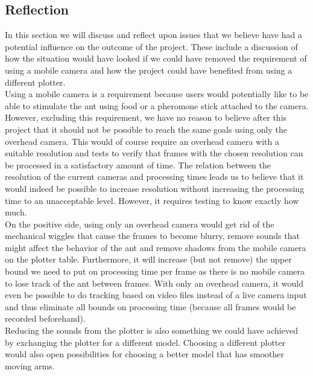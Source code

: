 
\subsection{Reflection}
In this section we will discuss and reflect upon issues that we believe have had a potential influence on the outcome of the project. These include a discussion of how the situation would have looked if we could have removed the requirement of using a mobile camera and how the project could have benefited from using a different plotter. \\

Using a mobile camera is a requirement because users would potentially like to be able to stimulate the ant using food or a pheromone stick attached to the camera. However, excluding this requirement, we have no reason to believe after this project that it should not be possible to reach the same goals using only the overhead camera. This would of course require an overhead camera with a suitable resolution and tests to verify that frames with the chosen resolution can be processed in a satisfactory amount of time. The relation between the resolution of the current cameras and processing times leads us to believe that it would indeed be possible to increase resolution without increasing the processing time to an unacceptable level. However, it requires testing to know exactly how much. \\

On the positive side, using only an overhead camera would get rid of the mechanical wiggles that cause the frames to become blurry, remove sounds that might affect the behavior of the ant and remove shadows from the mobile camera on the plotter table. Furthermore, it will increase (but not remove) the upper bound we need to put on processing time per frame as there is no mobile camera to lose track of the ant between frames. With only an overhead camera, it would even be possible to do tracking based on   video files instead of a live camera input and thus eliminate all bounds on processing time (because all frames would be recorded beforehand). \\

Reducing the sounds from the plotter is also something we could have achieved by exchanging the plotter for a different model. Choosing a different plotter would also open possibilities for choosing a better model that has smoother moving arms.


